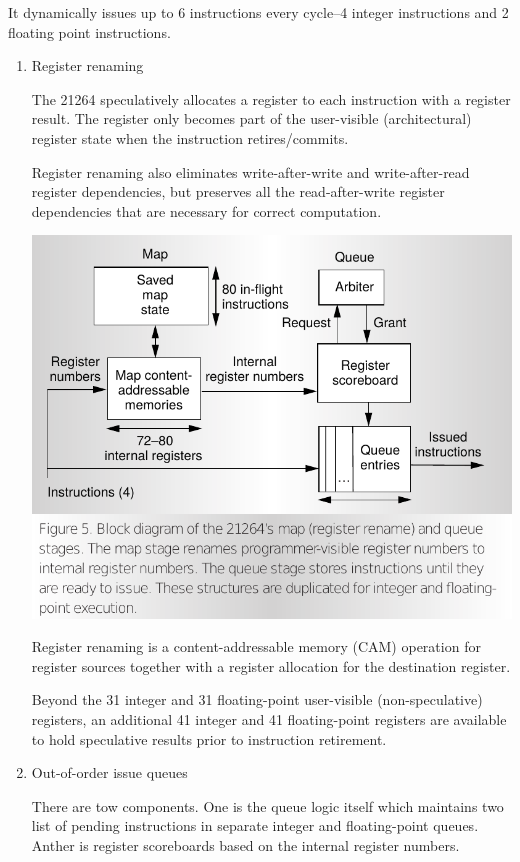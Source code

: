 \documentclass[11pt]{article}
\begin{document}
\begin{itemize}
	It dynamically issues up to 6 instructions every cycle--4 integer instructions and 2 floating point instructions.
	\begin{enumerate}
		\item Register renaming
		
		The 21264 speculatively allocates a register to each instruction with a register result. The register only becomes part of the user-visible (architectural) register state when the instruction retires/commits.
		
		Register renaming also eliminates write-after-write and write-after-read register dependencies, but preserves all the read-after-write register dependencies that are necessary for correct computation.
		\begin{center}
			\includegraphics[scale=0.35]{rename.png}
		\end{center}
		Register renaming is a content-addressable memory (CAM) operation for register sources together with a register allocation for the destination register.
		
		Beyond the 31 integer and 31 floating-point user-visible (non-speculative) registers, an additional 41 integer and 41 floating-point registers are available to hold speculative results prior to instruction retirement.
		\item Out-of-order issue queues
		
		There are tow components. One is the queue logic itself which maintains two list of pending instructions in separate integer and floating-point queues. Anther is register scoreboards based on the internal register numbers. 
		

\end{enumerate}
\end{itemize}
\end{document}
